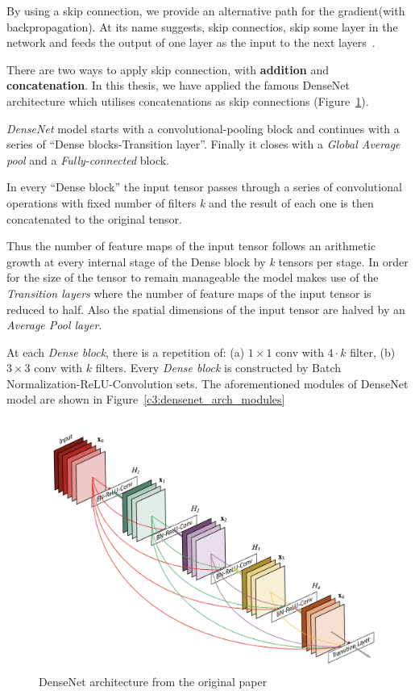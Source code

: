 By using a skip connection, we provide an alternative path for the gradient(with backpropagation). At its name suggests, skip connectios, skip some layer in the network and feeds the output of one layer as the input to the next layers~\cite{adaloglou2020skip}.

There are two ways to apply skip connection, with \textbf{addition} and \textbf{concatenation}. In this thesis, we have applied the famous DenseNet~\cite{huang2017densely} architecture which utilises concatenations as skip connections (Figure~\ref{c3:densenet_arch_origin}).

\textit{DenseNet} model starts with a convolutional-pooling block and continues with a series of ``Dense blocks-Transition layer''. Finally it closes with a \textit{Global Average pool} and a \textit{Fully-connected} block.

In every ``Dense block'' the input tensor passes through a series of convolutional operations with fixed number of filters \textit{k} and the result of each one is then concatenated to the original tensor.

Thus the number of feature maps of the input tensor follows an arithmetic growth at every internal stage of the Dense block by \textit{k} tensors per stage.
In order for the size of the tensor to remain manageable the model makes use of the \textit{Transition layers} where the number of feature maps of the input tensor is reduced to half. Also the spatial dimensions of the input tensor are halved by an \textit{Average Pool layer}.

At each \textit{Dense block}, there is a repetition of: (a) $1\times1$ conv with $4\cdot k$ filter, (b) $3\times3$ conv with $k$ filters. Every \textit{Dense block} is constructed by Batch Normalization-ReLU-Convolution sets. The aforementioned modules of DenseNet model are shown in Figure~\ref{c3:densenet_arch_modules}

\begin{figure}[h!]
    \centering  
    \includegraphics[width=.5\textwidth]{figures/chap3/cnn/architectures/densenet_arch_origin}
    \caption{DenseNet architecture from the original paper~\cite{huang2017densely}}
    \label{c3:densenet_arch_origin}
\end{figure}

